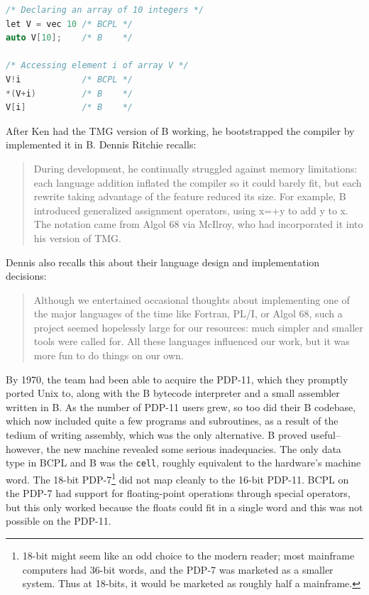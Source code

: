 \begin{lstlisting}[language=c,frame=single]
/* Declaring an array of 10 integers */
let V = vec 10 /* BCPL */
auto V[10];    /* B    */

/* Accessing element i of array V */
V!i            /* BCPL */
*(V+i)         /* B    */
V[i]           /* B    */
\end{lstlisting}

After Ken had the TMG version of B working, he \gls{bootstrap}ped the compiler
by implemented it in B.
Dennis Ritchie recalls\cite{development_of_c_language_chist_ritchie_1996}:

\begin{quotation}
	During development, he continually struggled against memory limitations: each
	language addition inflated the compiler so it could barely fit, but each
	rewrite taking advantage of the feature reduced its size. For example, B
	introduced generalized assignment operators, using x=+y to add y to x. The
	notation came from Algol 68 via McIlroy, who had incorporated
	it into his version of TMG.
\end{quotation}

Dennis also recalls this about their language design and implementation decisions:

\begin{quotation}
	Although we entertained occasional thoughts about implementing one of the major
	languages of the time like Fortran, PL/I, or Algol 68, such a project seemed
	hopelessly large for our resources: much simpler and smaller tools were called
	for. All these languages influenced our work, but it was more fun to do things
	on our own.
\end{quotation}

By 1970, the team had been able to acquire the PDP-11, which they promptly ported Unix to,
along with the B \gls{bytecode} interpreter and a small assembler written in B.
As the number of PDP-11 users grew, so too did their B codebase, which now included
quite a few programs and subroutines, as a result of the tedium of writing assembly,
which was the only alternative.
B proved useful--however, the new machine revealed some serious inadequacies.
The only data type in BCPL and B was the \texttt{cell}, roughly equivalent to the hardware's
machine word.
The 18-bit PDP-7\footnote{18-bit might seem like an odd choice to the modern reader;
	most mainframe computers had 36-bit words, and the PDP-7 was marketed as a smaller system.
	Thus at 18-bits, it would be marketed as roughly half a mainframe.}
did not map cleanly to the 16-bit PDP-11.
BCPL on the PDP-7 had support for floating-point operations through special operators, but this
only worked because the floats could fit in a single word and this was not possible on the PDP-11.

